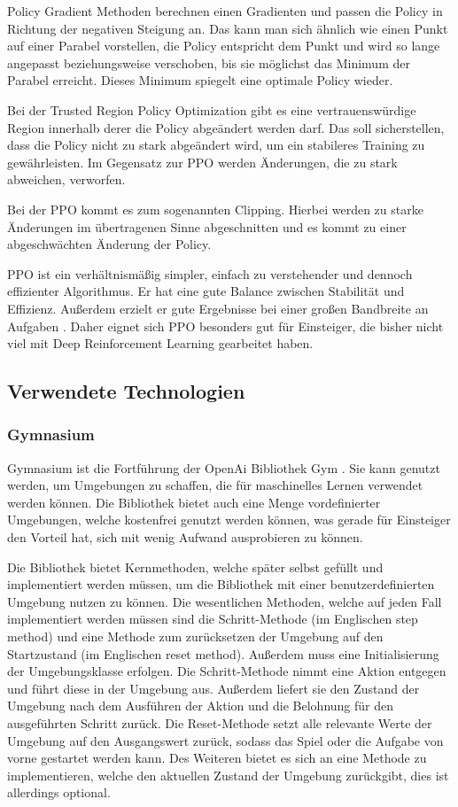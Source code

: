 Policy Gradient Methoden berechnen einen Gradienten und passen die Policy in Richtung der negativen Steigung an. Das kann man sich ähnlich wie einen Punkt auf einer Parabel vorstellen, die Policy entspricht dem Punkt und wird so lange angepasst beziehungsweise verschoben, bis sie möglichst das Minimum der Parabel erreicht. Dieses Minimum spiegelt eine optimale Policy wieder.

Bei der Trusted Region Policy Optimization gibt es eine vertrauenswürdige Region innerhalb derer die Policy abgeändert werden darf. Das soll sicherstellen, dass die Policy nicht zu stark abgeändert wird, um ein stabileres Training zu gewährleisten. Im Gegensatz zur PPO werden Änderungen, die zu stark abweichen, verworfen.

Bei der PPO kommt es zum sogenannten Clipping. Hierbei werden zu starke Änderungen im übertragenen Sinne abgeschnitten und es kommt zu einer abgeschwächten Änderung der Policy.

PPO ist ein verhältnismäßig simpler, einfach zu verstehender und dennoch effizienter Algorithmus. Er hat eine gute Balance zwischen Stabilität und Effizienz. Außerdem erzielt er gute Ergebnisse bei einer großen Bandbreite an Aufgaben \cite{schulman_proximal_2017}. Daher eignet sich PPO besonders gut für Einsteiger, die bisher nicht viel mit Deep Reinforcement Learning gearbeitet haben.
\subsection{Verwendete Technologien}
\subsubsection{Gymnasium}
Gymnasium ist die Fortführung der OpenAi Bibliothek Gym \cite{noauthor_gymnasium_nodate}. Sie kann genutzt werden, um Umgebungen zu schaffen, die für maschinelles Lernen verwendet werden können. Die Bibliothek bietet auch eine Menge vordefinierter Umgebungen, welche kostenfrei genutzt werden können, was gerade für Einsteiger den Vorteil hat, sich mit wenig Aufwand ausprobieren zu können.

Die Bibliothek bietet Kernmethoden, welche später selbst gefüllt und implementiert werden müssen, um die Bibliothek mit einer benutzerdefinierten Umgebung nutzen zu können. Die wesentlichen Methoden, welche auf jeden Fall implementiert werden müssen sind die Schritt-Methode (im Englischen step method) und eine Methode zum zurücksetzen der Umgebung auf den Startzustand (im Englischen reset method). Außerdem muss eine Initialisierung der Umgebungsklasse erfolgen. Die Schritt-Methode nimmt eine Aktion entgegen und führt diese in der Umgebung aus. Außerdem liefert sie den Zustand der Umgebung nach dem Ausführen der Aktion und die Belohnung für den ausgeführten Schritt zurück. Die Reset-Methode setzt alle relevante Werte der Umgebung auf den Ausgangswert zurück, sodass das Spiel oder die Aufgabe von vorne gestartet werden kann. Des Weiteren bietet es sich an eine Methode zu implementieren, welche den aktuellen Zustand der Umgebung zurückgibt, dies ist allerdings optional.

